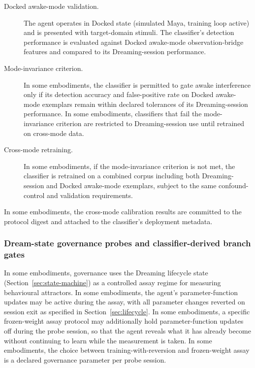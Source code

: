 \documentclass[a4paper,12pt]{article}
\begin{document}
\begin{description}
  \item[Docked awake-mode validation.] The agent operates in Docked
    state (simulated Maya, training loop active) and is presented with
    target-domain stimuli. The classifier's detection performance is
    evaluated against Docked awake-mode observation-bridge features and
    compared to its Dreaming-session performance.
  \item[Mode-invariance criterion.] In some embodiments, the
    classifier is permitted to gate awake interference only if its
    detection accuracy and false-positive rate on Docked awake-mode
    exemplars remain within declared tolerances of its Dreaming-session
    performance. In some embodiments, classifiers that fail the
    mode-invariance criterion are restricted to Dreaming-session use
    until retrained on cross-mode data.
  \item[Cross-mode retraining.] In some embodiments, if the
    mode-invariance criterion is not met, the classifier is retrained
    on a combined corpus including both Dreaming-session and Docked
    awake-mode exemplars, subject to the same confound-control and
    validation requirements.
\end{description}

In some embodiments, the cross-mode calibration results are committed
to the protocol digest and attached to the classifier's deployment
metadata.
\subsubsection{Dream-state governance probes and classifier-derived
  branch gates}
\label{sec:dream-state-governance-probes}

In some embodiments, governance uses the Dreaming lifecycle state
(Section~\ref{sec:state-machine}) as a controlled assay regime for
measuring behavioural attractors. In some embodiments, the agent's
parameter-function updates may be active during the assay, with all
parameter changes reverted on session exit as specified in
Section~\ref{sec:lifecycle}. In some embodiments, a specific
frozen-weight assay protocol may additionally hold parameter-function
updates off during the probe session, so that the agent reveals what
it has already become without continuing to learn while the
measurement is taken. In some embodiments, the choice between
training-with-reversion and frozen-weight assay is a declared
governance parameter per probe session.
\end{document}
